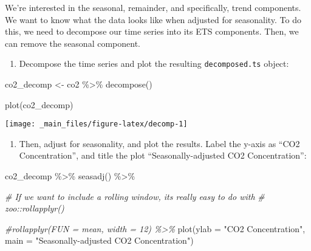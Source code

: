 \documentclass[
]{book}
\newenvironment{Shaded}{\begin{snugshade}}{\end{snugshade}}
\newcommand{\AttributeTok}[1]{\textcolor[rgb]{0.77,0.63,0.00}{#1}}
\newcommand{\CommentTok}[1]{\textcolor[rgb]{0.56,0.35,0.01}{\textit{#1}}}
\newcommand{\FunctionTok}[1]{\textcolor[rgb]{0.00,0.00,0.00}{#1}}
\newcommand{\NormalTok}[1]{#1}
\newcommand{\OtherTok}[1]{\textcolor[rgb]{0.56,0.35,0.01}{#1}}
\newcommand{\SpecialCharTok}[1]{\textcolor[rgb]{0.00,0.00,0.00}{#1}}
\newcommand{\StringTok}[1]{\textcolor[rgb]{0.31,0.60,0.02}{#1}}
\providecommand{\tightlist}{%
  \setlength{\itemsep}{0pt}\setlength{\parskip}{0pt}}
\begin{document}
We're interested in the seasonal, remainder, and specifically, trend components. We want to know what the data looks like when adjusted for seasonality. To do this, we need to decompose our time series into its ETS components. Then, we can remove the seasonal component.

\begin{enumerate}
\def\labelenumi{\arabic{enumi}.}
\setcounter{enumi}{2}
\tightlist
\item
  Decompose the time series and plot the resulting \texttt{decomposed.ts} object:
\end{enumerate}

\begin{Shaded}
\begin{Highlighting}[]
\NormalTok{co2\_decomp }\OtherTok{\textless{}{-}}\NormalTok{ co2 }\SpecialCharTok{\%\textgreater{}\%}
  \FunctionTok{decompose}\NormalTok{()}

\FunctionTok{plot}\NormalTok{(co2\_decomp)}
\end{Highlighting}
\end{Shaded}

\begin{center}\texttt{[image: \_main\_files/figure-latex/decomp-1]} \end{center}

\begin{enumerate}
\def\labelenumi{\arabic{enumi}.}
\setcounter{enumi}{3}
\tightlist
\item
  Then, adjust for seasonality, and plot the results. Label the y-axis as ``CO2 Concentration'', and title the plot ``Seasonally-adjusted CO2 Concentration'':
\end{enumerate}

\begin{Shaded}
\begin{Highlighting}[]
\NormalTok{co2\_decomp }\SpecialCharTok{\%\textgreater{}\%} 
  \FunctionTok{seasadj}\NormalTok{() }\SpecialCharTok{\%\textgreater{}\%} 
  
  \CommentTok{\# If we want to include a rolling window, it\textquotesingle{}s really easy to do with}
  \CommentTok{\# zoo::rollapplyr()}
  
  \CommentTok{\#rollapplyr(FUN = mean, width = 12) \%\textgreater{}\%}
  \FunctionTok{plot}\NormalTok{(}\AttributeTok{ylab =} \StringTok{"CO2 Concentration"}\NormalTok{, }\AttributeTok{main =} \StringTok{"Seasonally{-}adjusted CO2 Concentration"}\NormalTok{)}
\end{Highlighting}
\end{Shaded}
\end{document}
